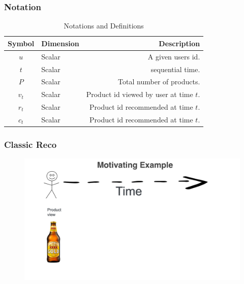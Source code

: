 

\begin{frame}[fragile]
  \frametitle{Notation}

\begin{table}
  \begin{tabular}{c l r}
    \toprule
    \textbf{Symbol} & \textbf{Dimension} & \textbf{Description} \\ 
    \midrule
    \midrule
    $u$ & Scalar & A given users id.  \\
    $t$ & Scalar & sequential time. \\%
    $P$ & Scalar & Total number of products. \\
    $v_{t}$ & Scalar & Product id viewed by user at time $t$.\\
    $r_{t}$ & Scalar & Product id recommended at time $t$.\\
    $c_{t}$ & Scalar & Product id recommended at time $t$.  \\  
    \bottomrule    
    \end{tabular}
    \caption{Notations and Definitions} 
    \vskip -15pt
    \label{tab:notation}
  \end{table}
\end{frame}



\begin{frame}
  \frametitle{Classic Reco}
 
 
   \begin{figure}[h!]
     \includegraphics[scale=0.25]{images/mot_ex1a.png}
       \centering
       \label{motex1}
   \end{figure}
     
 \end{frame}


